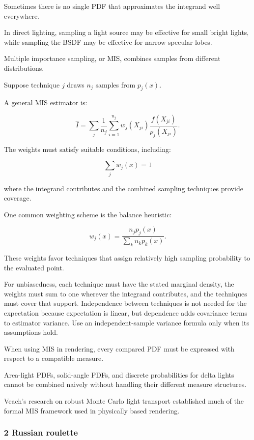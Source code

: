 \hypertarget{02-foundations-ii-ch031-multiple-importance-sampling}{}

Sometimes there is no single PDF that approximates the integrand well everywhere.

In direct lighting, sampling a light source may be effective for small bright lights, while sampling the BSDF may be effective for narrow specular lobes.

Multiple importance sampling, or MIS, combines samples from different distributions.

Suppose technique \(j\) draws \(n_j\) samples from \(p_j(x)\).

A general MIS estimator is:

\[
 \boxed{ \widehat I= \sum_j\frac1{n_j} \sum_{i=1}^{n_j} w_j(X_{ji}) \frac{f(X_{ji})}{p_j(X_{ji})} }.
\]

The weights must satisfy suitable conditions, including:

\[
 \sum_jw_j(x)=1
\]

where the integrand contributes and the combined sampling techniques provide coverage.

One common weighting scheme is the balance heuristic:

\[
 \boxed{ w_j(x)= \frac{n_jp_j(x)} {\sum_kn_kp_k(x)} }.
\]

These weights favor techniques that assign relatively high sampling probability to the evaluated point.

For unbiasedness, each technique must have the stated marginal density, the weights must sum to one wherever the integrand contributes, and the techniques must cover that support. Independence between techniques is not needed for the expectation because expectation is linear, but dependence adds covariance terms to estimator variance. Use an independent-sample variance formula only when its assumptions hold.

When using MIS in rendering, every compared PDF must be expressed with respect to a compatible measure.

Area-light PDFs, solid-angle PDFs, and discrete probabilities for delta lights cannot be combined naively without handling their different measure structures.

Veach's research on robust Monte Carlo light transport established much of the formal MIS framework used in physically based rendering.

\subsubsection{2 Russian roulette}\label{02-foundations-ii-ch031-russian-roulette}

